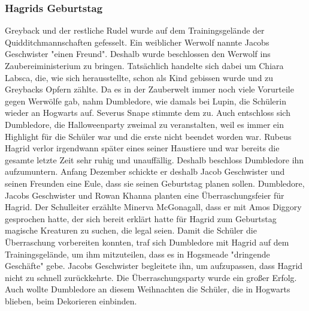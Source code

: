 \documentclass[a4paper, 10pt]{article}
\begin{document}
\subsubsection*{Hagrids Geburtstag}
Greyback und der restliche Rudel wurde auf dem Trainingsgelände der Quidditchmannschaften gefesselt. Ein weiblicher Werwolf nannte Jacobs Geschwister "einen Freund". Deshalb wurde beschlossen den Werwolf ins Zaubereiministerium zu bringen. Tatsächlich handelte sich dabei um Chiara Labsca, die, wie sich herausstellte, schon als Kind gebissen wurde und zu Greybacks Opfern zählte. Da es in der Zauberwelt immer noch viele Vorurteile gegen Werwölfe gab, nahm Dumbledore, wie damals bei Lupin, die Schülerin wieder an Hogwarts auf. Severus Snape stimmte dem zu. Auch entschloss sich Dumbledore, die Halloweenparty zweimal zu veranstalten, weil es immer ein Highlight für die Schüler war und die erste nicht beendet worden war.
\vspace{10pt}
\newline
{}  
Rubeus Hagrid verlor irgendwann später eines seiner Haustiere und war bereits die gesamte letzte Zeit sehr ruhig und unauffällig. Deshalb beschloss Dumbledore ihn aufzumuntern. Anfang Dezember schickte er deshalb Jacob Geschwister und seinen Freunden eine Eule, dass sie seinen Geburtstag planen sollen. Dumbledore, Jacobs Geschwister und Rowan Khanna planten eine Überraschungsfeier für Hagrid.
\vspace{10pt}
\newline
{}  
Der Schulleiter erzählte Minerva McGonagall, dass er mit Amos Diggory gesprochen hatte, der sich bereit erklärt hatte für Hagrid zum Geburtstag magische Kreaturen zu suchen, die legal seien. Damit die Schüler die Überraschung vorbereiten konnten, traf sich Dumbledore mit Hagrid auf dem Trainingsgelände, um ihm mitzuteilen, dass es in Hogsmeade "dringende Geschäfte" gebe. Jacobs Geschwister begleitete ihn, um aufzupassen, dass Hagrid nicht zu schnell zurückkehrte. Die Überraschungsparty wurde ein großer Erfolg.
\vspace{10pt}
\newline
{}  
Auch wollte Dumbledore an diesem Weihnachten die Schüler, die in Hogwarts blieben, beim Dekorieren einbinden.
\end{document}

